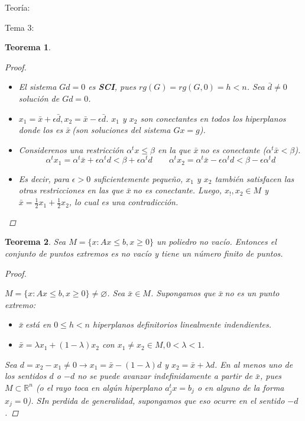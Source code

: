 \documentclass{article}
\newcommand{\bx}{$\bar x \ $}
\newcommand{\M}{M = \{x: Ax \leq b, x\geq 0\}}
\newtheorem*{theorem*}{Teorema}
\begin{document}
\begin{section}{Teoría:}
\begin{subsection}{Tema 3:}
\begin{theorem*}{3.3}
\begin{proof}
\begin{itemize}
                    \item El sistema $Gd = 0$ es \textbf{SCI}, pues $rg(G) = rg(G,0) = h < n$. Sea $\bar d \neq 0$ solución de $Gd = 0$.
                    \item $x_1 = \bar{x} + \epsilon \bar{d}, x_2 = \bar{x} - \epsilon \bar{d}$. $x_1$ y $x_2$ son conectantes en todos los hiperplanos
                    donde los es \bx (son soluciones del sistema $Gx = g$).

                    \item Considerenos una restricción $\alpha^t x \leq \beta$ en la que \bx no es conectante ($\alpha^t \bar{x} < \beta$).
                    \[\alpha^t x_1 = \alpha^t \bar{x} + \epsilon\alpha^t d<\beta +\epsilon \alpha^t d \quad\quad \alpha^t x_2 = \alpha^t \bar{x} - \epsilon\alpha^t d<\beta -\epsilon \alpha^t d\]

                    \item Es decir, para $\epsilon > 0$ suficientemente pequeño, $x_1$ y $x_2$ también satisfacen las otras restricciones en las que \bx no es conectante. Luego,
                    $x_!, x_2 \in M$ y $\bar{x} = \frac{1}{2}x_1 + \frac{1}{2}x_2$, lo cual es una contradicción.
                \end{itemize}
            \end{proof}
            
        \end{theorem*}

        \begin{theorem*}{3.5}
            
            Sea $\M$ un poliedro no vacío. Entonces el conjunto de puntos extremos es no vacío y tiene un número finito de puntos.

            \begin{proof}
                \

                $\M \neq \varnothing $. Sea $\bar{x} \in M$. Supongamos que \bx no es un punto extremo:
                \begin{itemize}
                    \item \bx está en $0\leq h <n$ hiperplanos definitorios linealmente indendientes.
                    \item $\bar{x} = \lambda x_1 + (1-\lambda)x_2$ con $x_1 \neq x_2 \in M, 0<\lambda < 1$.
                \end{itemize}
                Sea $d = x_2-x_1\neq 0 \rightarrow x_1=\bar{x}-(1-\lambda)d$ y $x_2 = \bar{x} + \lambda d$. En al menos uno de los sentidos
                $d$ o $-d$ no se puede avanzar indefinidamente a partir de $\bar{x}$, pues $M \subset \mathbb{R}^n$ (o el rayo toca en algún hiperplano
                $a^t_j x = b_j$ o en alguno de la forma $x_j = 0$). SIn perdida de generalidad, supongamos que eso ocurre en el sentido $-d$.


\end{proof}
\end{theorem*}
\end{subsection}
\end{section}
\end{document}
